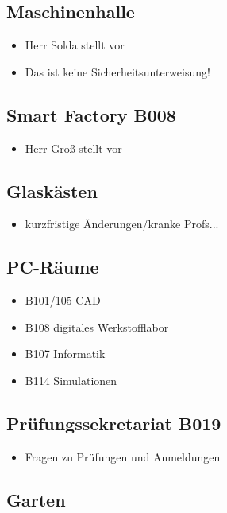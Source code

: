 \documentclass[11pt,ngerman]{scrartcl}
\begin{document}
\subsection*{Maschinenhalle}
\begin{itemize}
    \item Herr Solda stellt vor
    \item Das ist keine Sicherheitsunterweisung!
\end{itemize}

\subsection*{Smart Factory B008}
\begin{itemize}
    \item Herr Groß stellt vor
\end{itemize}

\subsection*{Glaskästen}
\begin{itemize}
    \item kurzfristige Änderungen/kranke Profs...
\end{itemize}

\subsection*{PC-Räume}
\begin{itemize}
    \item B101/105 CAD
    \item B108 digitales Werkstofflabor
    \item B107 Informatik
    \item B114 Simulationen
\end{itemize}

\subsection*{Prüfungssekretariat B019}
\begin{itemize}
    \item Fragen zu Prüfungen und Anmeldungen
\end{itemize}

\subsection*{Garten}
\end{document}

